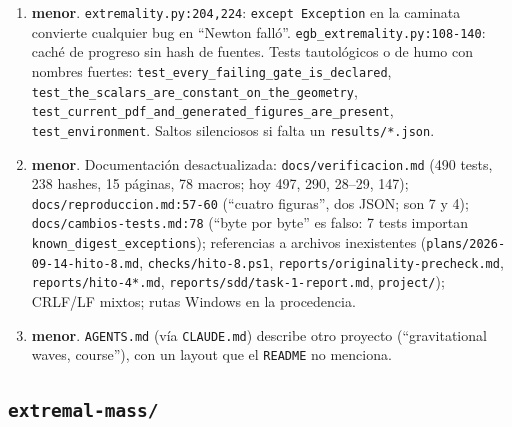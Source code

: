\documentclass[10pt,a4paper]{article}
\newcommand{\MEN}{\textbf{menor}}
\newcommand{\code}[1]{\texttt{#1}}
\begin{document}
\begin{enumerate}[label=C\arabic*.,leftmargin=2.4em]
 ($2.2\times10^{-2}$); \code{docs/resultados.md:16-18} dice que \code{psi\_uncertainty} no debe
 usarse. Para $\mu$ sólo se usa la dispersión de tres grados (R01 sigue abierto;
 \code{checks/route\_envelopes.py} lo calcula pero no es test).
\item \MEN. \code{extremality.py:204,224}: \code{except Exception} en la caminata convierte
 cualquier bug en ``Newton falló''. \code{egb\_extremality.py:108-140}: caché de progreso sin hash de
 fuentes. Tests tautológicos o de humo con nombres fuertes:
 \code{test\_every\_failing\_gate\_is\_declared}, \code{test\_the\_scalars\_are\_constant\_on\_the\_geometry},
 \code{test\_current\_pdf\_and\_generated\_figures\_are\_present}, \code{test\_environment}.
 Saltos silenciosos si falta un \code{results/*.json}.
\item \MEN. Documentación desactualizada: \code{docs/verificacion.md} (490 tests, 238 hashes, 15
 páginas, 78 macros; hoy 497, 290, 28--29, 147); \code{docs/reproduccion.md:57-60} (``cuatro
 figuras'', dos JSON; son 7 y 4); \code{docs/cambios-tests.md:78} (``byte por byte'' es falso: 7
 tests importan \code{known\_digest\_exceptions}); referencias a archivos inexistentes
 (\code{plans/2026-09-14-hito-8.md}, \code{checks/hito-8.ps1}, \code{reports/originality-precheck.md},
 \code{reports/hito-4*.md}, \code{reports/sdd/task-1-report.md}, \code{project/}); CRLF/LF mixtos;
 rutas Windows en la procedencia.
\item \MEN. \code{AGENTS.md} (vía \code{CLAUDE.md}) describe otro proyecto (``gravitational waves,
 course''), con un layout que el \code{README} no menciona.
\end{enumerate}

\subsection{\code{extremal-mass/}}
\label{sec:em}
\end{document}
